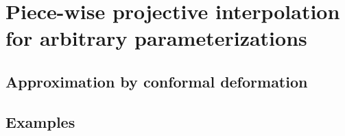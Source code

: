 \section[Piece-wise projective interpolation for arbitrary parameterizations] %
{Piece-wise projective interpolation for arbitrary parameterizations %
}

\subsection{Approximation by conformal deformation}
\subsection{Examples}

